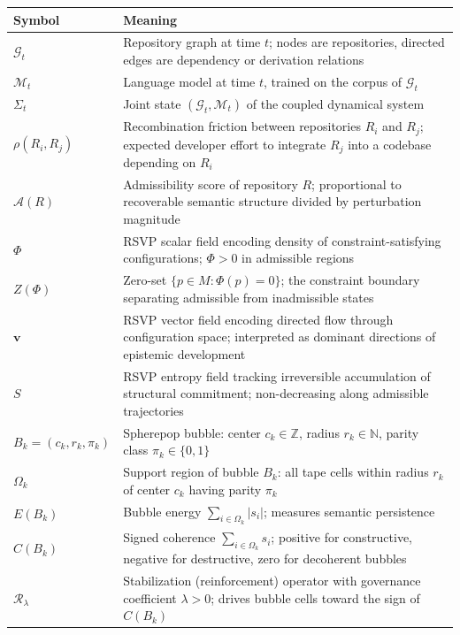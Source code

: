 \documentclass[11pt]{article}
\begin{document}
\medskip
\begin{center}
\begin{tabular}{lp{9.5cm}}
\toprule
\textbf{Symbol} & \textbf{Meaning} \\
\midrule
$\mathcal{G}_t$ & Repository graph at time $t$; nodes are repositories,
  directed edges are dependency or derivation relations \\
$\mathcal{M}_t$ & Language model at time $t$, trained on the corpus of
  $\mathcal{G}_t$ \\
$\Sigma_t$ & Joint state $(\mathcal{G}_t, \mathcal{M}_t)$ of the
  coupled dynamical system \\
$\rho(R_i, R_j)$ & Recombination friction between repositories $R_i$ and $R_j$;
  expected developer effort to integrate $R_j$ into a codebase depending on $R_i$ \\
$\mathcal{A}(R)$ & Admissibility score of repository $R$; proportional to
  recoverable semantic structure divided by perturbation magnitude \\
$\Phi$ & RSVP scalar field encoding density of constraint-satisfying
  configurations; $\Phi > 0$ in admissible regions \\
$Z(\Phi)$ & Zero-set $\{p \in M : \Phi(p) = 0\}$; the constraint boundary
  separating admissible from inadmissible states \\
$\mathbf{v}$ & RSVP vector field encoding directed flow through configuration
  space; interpreted as dominant directions of epistemic development \\
$S$ & RSVP entropy field tracking irreversible accumulation of structural
  commitment; non-decreasing along admissible trajectories \\
$B_k = (c_k, r_k, \pi_k)$ & Spherepop bubble: center $c_k \in \mathbb{Z}$,
  radius $r_k \in \mathbb{N}$, parity class $\pi_k \in \{0,1\}$ \\
$\Omega_k$ & Support region of bubble $B_k$: all tape cells within radius
  $r_k$ of center $c_k$ having parity $\pi_k$ \\
$E(B_k)$ & Bubble energy $\sum_{i \in \Omega_k} |s_i|$; measures semantic
  persistence \\
$C(B_k)$ & Signed coherence $\sum_{i \in \Omega_k} s_i$; positive for
  constructive, negative for destructive, zero for decoherent bubbles \\
$\mathcal{R}_\lambda$ & Stabilization (reinforcement) operator with governance
  coefficient $\lambda > 0$; drives bubble cells toward the sign of $C(B_k)$ \\

\end{tabular}
\end{center}
\end{document}
